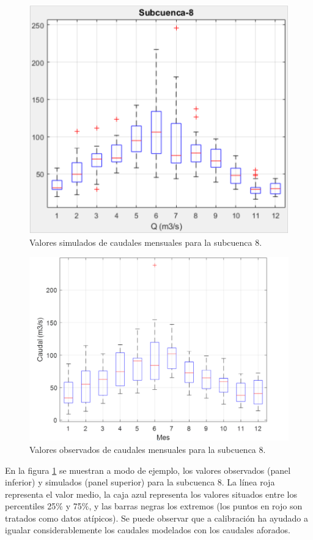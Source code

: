 \begin{figure}[h!]
    \begin{center}
      \includegraphics[height=3.in]{Figures/caudal_sim.PNG}
      \caption{ Valores simulados de caudales mensuales para la subcuenca 8.}
      \label{2}
    \end{center}
  \end{figure}



 \begin{figure}[h!]
    \begin{center}
      \includegraphics[height=3.in]{Figures/caudal_obs.PNG}
      \caption{ Valores observados de caudales mensuales para la subcuenca 8.}
      \label{3}
    \end{center}
  \end{figure}



  En la figura \ref{2} se muestran a modo de ejemplo, los valores observados (panel inferior) y simulados  (panel superior) para la subcuenca 8.
  La línea roja representa el valor medio, la caja azul representa los valores situados entre los percentiles
  25$\%$ y 75$\%$, y las barras negras los extremos (los puntos en rojo son tratados como datos atípicos). 
   Se puede observar que a calibración ha ayudado a igualar considerablemente los caudales modelados con los caudales aforados.


